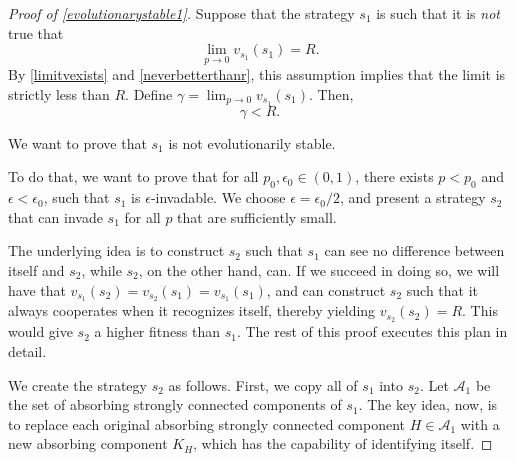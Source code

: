 \documentclass[11pt]{amsart}
\theoremstyle{definition}
\theoremstyle{remark}
\begin{document}
    \begin{proof}[Proof of \cref{evolutionarystable1}]
      Suppose that the strategy $s_1$ is such that it is \textit{not} true that \begin{equation*}
        \lim_{p \to 0 } v_{s_1}(s_1) = R.
      \end{equation*}
      By \cref{limitvexists} and \cref{neverbetterthanr}, this assumption implies that the limit is strictly less than $R$. Define $\gamma = \lim_{p \to 0} v_{s_1}(s_1)$. Then,
      \begin{equation*}
        \gamma < R.
      \end{equation*}
      
      We want to prove that $s_1$ is not evolutionarily stable. 
      
      To do that, we want to prove that for all $p_0, \epsilon_0 \in (0,1)$, there exists $p < p_0$ and $\epsilon < \epsilon_0$, such that $s_1$ is $\epsilon$-invadable. We choose $\epsilon = \epsilon_0 / 2$, and present a strategy $s_2$ that can invade $s_1$ for all $p$ that are sufficiently small.


      The underlying idea is to construct $s_2$ such that $s_1$ can see no difference between itself and $s_2$, while $s_2$, on the other hand, can. If we succeed in doing so, we will have that $v_{s_1}(s_2) = v_{s_2}(s_1) = v_{s_1}(s_1)$, and can construct $s_2$ such that it always cooperates when it recognizes itself, thereby yielding $v_{s_2}(s_2) = R$. This would give $s_2$ a higher fitness than $s_1$. The rest of this proof executes this plan in detail.

      We create the strategy $s_2$ as follows. First, we copy all of $s_1$ into $s_2$. Let $\mathcal{A}_1$ be the set of
       absorbing strongly connected components of $s_1$. The key idea, now, is to replace each original absorbing strongly connected component $H \in \mathcal{A}_1$ with a new absorbing component $K_H$, which has the capability of identifying itself.


\end{proof}
\end{document}

